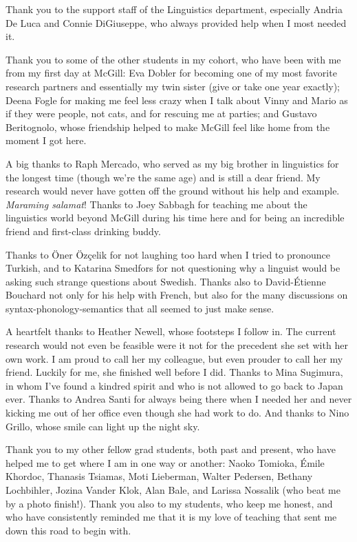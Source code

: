 Thank you to the support staff of the Linguistics department, especially Andria De Luca and Connie DiGiuseppe, who always provided help when I most needed it.

Thank you to some of the other students in my cohort, who have been with me from my first day at McGill: Eva Dobler for becoming one of my most favorite research partners and essentially my twin sister (give or take one year exactly); Deena Fogle for making me feel less crazy when I talk about Vinny and Mario as if they were people, not cats, and for rescuing me at parties; and Gustavo Beritognolo, whose friendship helped to make McGill feel like home from the moment I got here.

A big thanks to Raph Mercado, who served as my big brother in linguistics for the longest time (though we're the same age) and is still a dear friend. My research would never have gotten off the ground without his help and example. {\it Maraming salamat}! Thanks to Joey Sabbagh for teaching me about the linguistics world beyond McGill during his time here and for being an incredible friend and first-class drinking buddy.

Thanks to \"{O}ner \"{O}z\c{c}elik for not laughing too hard when I tried to pronounce Turkish, and to Katarina Smedfors for not questioning why a linguist would be asking such strange questions about Swedish. Thanks also to David-\'{E}tienne Bouchard not only for his help with French, but also for the many discussions on syntax-phonology-semantics that all seemed to just make sense.

A heartfelt thanks to Heather Newell, whose footsteps I follow in. The current research would not even be feasible were it not for the precedent she set with her own work. I am proud to call her my colleague, but even prouder to call her my friend. Luckily for me, she finished well before I did. Thanks to Mina Sugimura, in whom I've found a kindred spirit and who is not allowed to go back to Japan ever. Thanks to Andrea Santi for always being there when I needed her and never kicking me out of her office even though she had work to do. And thanks to Nino Grillo, whose smile can light up the night sky.

Thank you to my other fellow grad students, both past and present, who have helped me to get where I am in one way or another: Naoko Tomioka, \'{E}mile Khordoc, Thanasis Tsiamas, Moti Lieberman, Walter Pedersen, Bethany Lochbihler, Jozina Vander Klok, Alan Bale, and Larissa Nossalik (who beat me by a photo finish!). Thank you also to my students, who keep me honest, and who have consistently reminded me that it is my love of teaching that sent me down this road to begin with.

